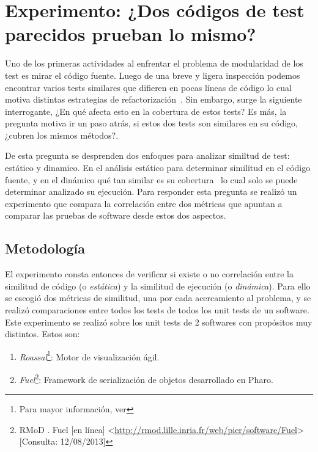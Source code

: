 \chapter{Experimento: ¿Dos códigos de test parecidos prueban lo mismo? }

\par Uno de los primeras actividades al enfrentar el problema de modularidad de los test es mirar el código fuente. Luego de una breve y ligera inspección podemos encontrar varios tests similares que difieren en pocas líneas de código lo cual motiva distintas estrategias de refactorización~\cite{roy2007survey,rattan2013software,Kosc13a}. Sin embargo, surge la siguiente interrogante, ¿En qué afecta esto en la cobertura de estos tests? Es más, la pregunta motiva ir un paso atrás, si estos dos tests son similares en su código, ¿cubren los mismos métodos?.

\par De esta pregunta se desprenden dos enfoques para analizar similtud de test: estático y dinamico. En el análisis estático para determinar similitud en el código fuente, y en el dinámico qué tan similar es su cobertura~\cite{Horwi02a} lo cual solo se puede determinar analizado su ejecución. Para responder esta pregunta se realizó un experimento que compara la correlación entre dos métricas que apuntan a comparar las pruebas de software desde estos dos aspectos.

\section{Metodología}

\par El experimento consta entonces de verificar si existe o no correlación  entre la similitud de código (o \emph{estática}) y la similitud de ejecución (o \emph{dinámica}). Para ello se escogió dos métricas de similitud, una por cada acercamiento al problema, y se realizó comparaciones entre todos los tests de todos los unit tests de un software. Este experimento se realizó sobre los unit tests de 2 softwares con propósitos muy distintos. Estos son: 

\begin{enumerate} 
\item \emph{Roassal}\footnote{Para mayor información, ver }: Motor de visualización ágil.
\item \emph{Fuel}\footnote{RMoD . Fuel [en línea] \textless\url{http://rmod.lille.inria.fr/web/pier/software/Fuel}\textgreater [Consulta: 12/08/2013] }: Framework de serialización de objetos desarrollado en Pharo.
\end{enumerate}

